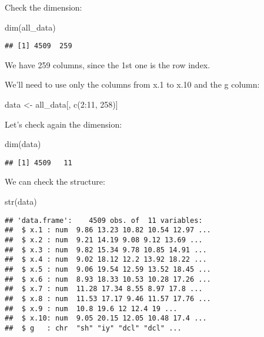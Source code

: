 \documentclass[
]{article}
\newenvironment{Shaded}{\begin{snugshade}}{\end{snugshade}}
\newcommand{\DecValTok}[1]{\textcolor[rgb]{0.00,0.00,0.81}{#1}}
\newcommand{\FunctionTok}[1]{\textcolor[rgb]{0.00,0.00,0.00}{#1}}
\newcommand{\NormalTok}[1]{#1}
\newcommand{\OtherTok}[1]{\textcolor[rgb]{0.56,0.35,0.01}{#1}}
\newcommand{\SpecialCharTok}[1]{\textcolor[rgb]{0.00,0.00,0.00}{#1}}
\begin{document}
Check the dimension:

\begin{Shaded}
\begin{Highlighting}[]
\FunctionTok{dim}\NormalTok{(all\_data)}
\end{Highlighting}
\end{Shaded}

\begin{verbatim}
## [1] 4509  259
\end{verbatim}

We have 259 columns, since the 1st one is the row index.

We'll need to use only the columns from x.1 to x.10 and the g column:

\begin{Shaded}
\begin{Highlighting}[]
\NormalTok{data }\OtherTok{\textless{}{-}}\NormalTok{ all\_data[, }\FunctionTok{c}\NormalTok{(}\DecValTok{2}\SpecialCharTok{:}\DecValTok{11}\NormalTok{, }\DecValTok{258}\NormalTok{)]}
\end{Highlighting}
\end{Shaded}

Let's check again the dimension:

\begin{Shaded}
\begin{Highlighting}[]
\FunctionTok{dim}\NormalTok{(data)}
\end{Highlighting}
\end{Shaded}

\begin{verbatim}
## [1] 4509   11
\end{verbatim}

We can check the structure:

\begin{Shaded}
\begin{Highlighting}[]
\FunctionTok{str}\NormalTok{(data)}
\end{Highlighting}
\end{Shaded}

\begin{verbatim}
## 'data.frame':    4509 obs. of  11 variables:
##  $ x.1 : num  9.86 13.23 10.82 10.54 12.97 ...
##  $ x.2 : num  9.21 14.19 9.08 9.12 13.69 ...
##  $ x.3 : num  9.82 15.34 9.78 10.85 14.91 ...
##  $ x.4 : num  9.02 18.12 12.2 13.92 18.22 ...
##  $ x.5 : num  9.06 19.54 12.59 13.52 18.45 ...
##  $ x.6 : num  8.93 18.33 10.53 10.28 17.26 ...
##  $ x.7 : num  11.28 17.34 8.55 8.97 17.8 ...
##  $ x.8 : num  11.53 17.17 9.46 11.57 17.76 ...
##  $ x.9 : num  10.8 19.6 12 12.4 19 ...
##  $ x.10: num  9.05 20.15 12.05 10.48 17.4 ...
##  $ g   : chr  "sh" "iy" "dcl" "dcl" ...
\end{verbatim}
\end{document}
